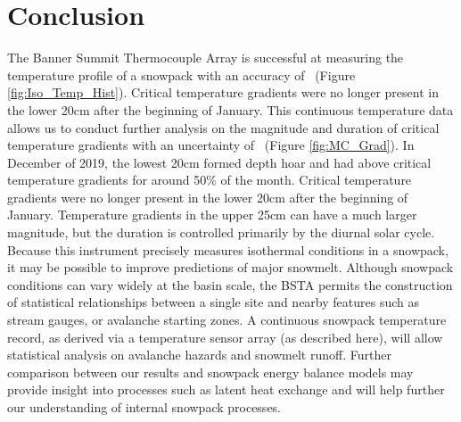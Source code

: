 \chapter{Conclusion}

The Banner Summit Thermocouple Array is successful at measuring the temperature profile of a snowpack with an accuracy of \isostd \ (Figure \ref{fig:Iso_Temp_Hist}). Critical temperature gradients were no longer present in the lower 20cm after the beginning of January. This continuous temperature data allows us to conduct further analysis on the magnitude and duration of critical temperature gradients with an uncertainty of \gradstd \ (Figure \ref{fig:MC_Grad}). In December of 2019, the lowest 20cm formed depth hoar and had above critical temperature gradients for around 50\% of the month. Critical temperature gradients were no longer present in the lower 20cm after the beginning of January. Temperature gradients in the upper 25cm can have a much larger magnitude, but the duration is controlled primarily by the diurnal solar cycle. Because this instrument precisely measures isothermal conditions in a snowpack, it may be possible to improve predictions of major snowmelt. Although snowpack conditions can vary widely at the basin scale, the BSTA permits the construction of statistical relationships between a single site and nearby features such as stream gauges, or avalanche starting zones. A continuous snowpack temperature record, as derived via a temperature sensor array (as described here), will allow statistical analysis on avalanche hazards and snowmelt runoff. Further comparison between our results and snowpack energy balance models may provide insight into processes such as latent heat exchange and will help further our understanding of internal snowpack processes. 


